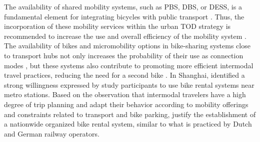 \begin{refsegment}
The availability of shared mobility systems, such as \acrshort{PBS}, \acrshort{DBS}, or \acrshort{DESS}, is a fundamental element for integrating bicycles with public transport \textcolor{blue}{\autocite[11-12]{wu_measuring_2019}}. Thus, the incorporation of these mobility services within the urban \acrshort{TOD} strategy is recommended to increase the use and overall efficiency of the mobility system \textcolor{blue}{\autocite[16]{tamakloe_determinants_2021}}. The availability of bikes and micromobility options in bike-sharing systems close to transport hubs not only increases the probability of their use as connection modes \textcolor{blue}{\autocite[25]{guo_dockless_2021}}, but these systems also contribute to promoting more efficient intermodal travel practices, reducing the need for a second bike \textcolor{blue}{\autocite[10]{jonkeren_bicycle_2021}}. In Shanghai, \textcolor{blue}{\textcite[186]{pan_intermodal_2010}} identified a strong willingness expressed by study participants to use bike rental systems near metro stations. Based on the observation that intermodal travelers have a high degree of trip planning and adapt their behavior according to mobility offerings and constraints related to transport and bike parking, \textcolor{blue}{\textcite[196]{sherwin_practices_2011}} justify the establishment of a nationwide organized bike rental system, similar to what is practiced by Dutch and German railway operators.%


\end{refsegment}
